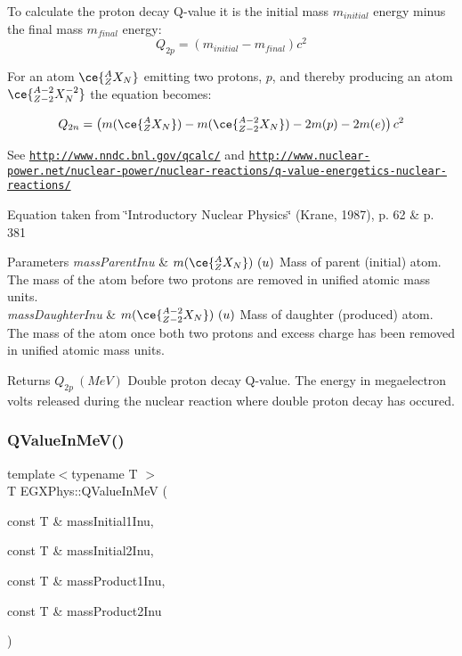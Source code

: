 To calculate the proton decay Q-\/value it is the initial mass $m_{initial}$ energy minus the final mass $m_{final}$ energy\+: \[Q_{2p} = \left ( m_{initial}-m_{final}\right ) c^2\]

For an atom $\ce{ ^{A}_{Z}X_{N} }$ emitting two protons, $p$, and thereby producing an atom $\ce{ ^{A-2}_{Z-2}X^{-2}_{N} }$ the equation becomes\+:

\[Q_{2n} = \left ( m(\ce{ ^{A}_{Z}X_{N} }) - m(\ce{ ^{A-2}_{Z-2}X_{N} }) - 2m(p) - 2m(e)\right ) c^2\]

See \href{http://www.nndc.bnl.gov/qcalc/}{\tt http\+://www.\+nndc.\+bnl.\+gov/qcalc/} and \href{http://www.nuclear-power.net/nuclear-power/nuclear-reactions/q-value-energetics-nuclear-reactions/}{\tt http\+://www.\+nuclear-\/power.\+net/nuclear-\/power/nuclear-\/reactions/q-\/value-\/energetics-\/nuclear-\/reactions/}

Equation taken from \char`\"{}\+Introductory Nuclear Physics\char`\"{} (Krane, 1987), p. 62 \& p. 381


\begin{DoxyParams}{Parameters}
{\em mass\+Parent\+Inu} & $m(\ce{ ^{A}_{Z}X_{N} })\ (u)$ Mass of parent (initial) atom. The mass of the atom before two protons are removed in unified atomic mass units. \\
\hline
{\em mass\+Daughter\+Inu} & $m(\ce{ ^{A-2}_{Z-2}X_{N} })\ (u)$ Mass of daughter (produced) atom. The mass of the atom once both two protons and excess charge has been removed in unified atomic mass units. \\
\hline
\end{DoxyParams}
\begin{DoxyReturn}{Returns}
$Q_{2p}\ (MeV)$ Double proton decay Q-\/value. The energy in megaelectron volts released during the nuclear reaction where double proton decay has occured. 
\end{DoxyReturn}
\mbox{\label{group___q_value_ga9de3868818a3548b4a4ab42f8c17278d}} 
\subsubsection{\texorpdfstring{Q\+Value\+In\+Me\+V()}{QValueInMeV()}}
{\footnotesize\ttfamily template$<$typename T $>$ \\
T E\+G\+X\+Phys\+::\+Q\+Value\+In\+MeV (\begin{DoxyParamCaption}\item[{const T \&}]{mass\+Initial1\+Inu,  }\item[{const T \&}]{mass\+Initial2\+Inu,  }\item[{const T \&}]{mass\+Product1\+Inu,  }\item[{const T \&}]{mass\+Product2\+Inu }\end{DoxyParamCaption})}



